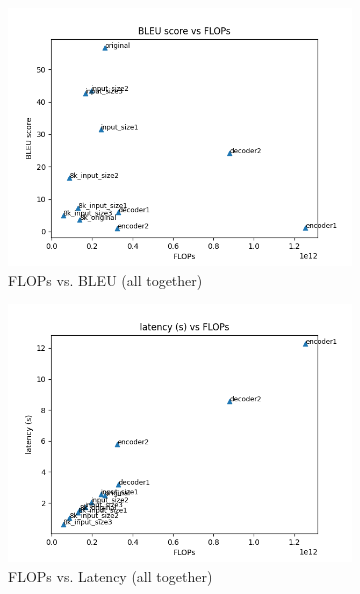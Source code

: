 \documentclass[11pt]{article}
\begin{document}
\begin{figure}[h!]
    \centering
    \begin{subfigure}{0.32\textwidth}
        \includegraphics[width=\textwidth]{images/All/BLEU_vs_FLOP.png}
        \caption{FLOPs vs. BLEU (all together)}
    \end{subfigure}
    \begin{subfigure}{0.32\textwidth}
        \includegraphics[width=\textwidth]{images/All/latency_vs_FLOP.png}
        \caption{FLOPs vs. Latency (all together)}
    \end{subfigure}
    \begin{subfigure}{0.32\textwidth}

\end{subfigure}
\end{figure}
\end{document}
